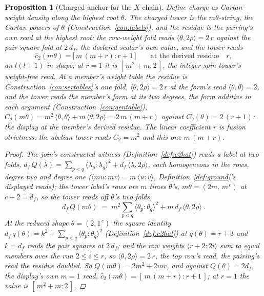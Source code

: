 \documentclass[11pt]{article}
\newtheorem{proposition}{Proposition}
\theoremstyle{definition}
\begin{document}
\begin{proposition}[Charged anchor for the $X$-chain]\label{prop:anchor}
Define charge as Cartan-weight density along the highest root
$\theta$.
The charged tower is the $m\theta$-string, the Cartan powers of
$\theta$ (Construction~\ref{con:labels}), and the residue is the
pairing's own read at the highest root: the row-weight fold reads
$\langle\theta,2\rho\rangle=2\,r$ against the pair-square fold at
$2\,d_f$, the declared scalar's own value, and the tower reads
\[
\hat c_2(m\theta)=\big[\,m\,(m+r):r+1\,\big]
\qquad\text{at the derived residue}\quad r ,
\]
an $l(l+1)$ in shape; at $r=1$ it is $[\,m^2+m:2\,]$, the
integer-spin tower's weight-free read. At a member's weight table
the residue is Construction~\ref{con:sertables}'s one fold,
$\langle\theta,2\rho\rangle=2\,r$ at the form's read
$\langle\theta,\theta\rangle=2$, and the tower reads the member's
form at its two degrees, the form additive in each argument
(Construction~\ref{con:gentable}),
$C_2(m\theta)=m^2\,\langle\theta,\theta\rangle
+m\,\langle\theta,2\rho\rangle=2\,m\,(m+r)$ against
$C_2(\theta)=2\,(r+1)$: the display at the member's derived
residue. The
linear coefficient $r$ is fusion strictness: the abelian tower reads
$C_2=m^2$ and this one $m\,(m+r)$.
\begin{proof}
The join's constructed witness (Definition~\ref{def:c2hat}) reads
a label at two folds,
$d_f\,Q(\lambda)=\sum_{p<q}\langle\lambda_p\!:\!\lambda_q\rangle^2
+d_f\,\langle\lambda,2\rho\rangle$, each homogeneous in the rows,
degree two and degree one
($\langle mu\!:\!mv\rangle=m\,\langle u\!:\!v\rangle$,
Definition~\ref{def:ground}'s displayed reads); the tower label's
rows are $m$ times $\theta$'s, $m\theta=(2m,\,m^{\,c})$ at
$c+2=d_f$, so the tower reads off $\theta$'s two folds,
\[
d_f\,Q(m\theta)\;=\;m^{2}\sum_{p<q}
\langle\theta_p\!:\!\theta_q\rangle^{2}
+m\,d_f\,\langle\theta,2\rho\rangle\ .
\]
At the reduced shape $\theta=(2,1^{\,c})$ the square identity
$d_f\,q(\theta)=k^{2}+\sum_{p<q}\langle\theta_p\!:\!\theta_q
\rangle^{2}$ (Definition~\ref{def:c2hat}) at $q(\theta)=r+3$ and
$k=d_f$ reads the pair squares at $2\,d_f$; and the row weights
$\langle r+2\!:\!2i\rangle$ sum to equal members over the run
$2\le i\le r$, so $\langle\theta,2\rho\rangle=2\,r$, the top row's
read, the pairing's read the residue doubled. So
$Q(m\theta)=2m^2+2mr$, and
against $Q(\theta)=2d_f$, the display's own $m=1$ read,
$\hat c_2(m\theta)=[\,m\,(m+r):r+1\,]$; at $r=1$ the value is
$[\,m^2+m:2\,]$.
\end{proof}

\end{proposition}
\end{document}
